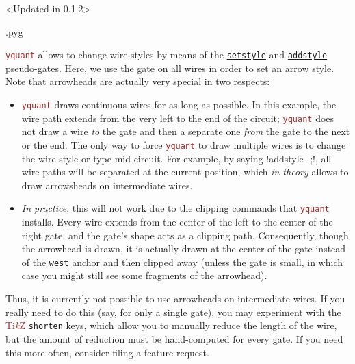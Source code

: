 \documentclass{scrartcl}
\makeatletter
\newenvironment{codeexample}{%
   \VerbatimEnvironment%
   \let\FVB@VerbatimOut\minted@FVB@VerbatimOut
   \let\FVE@VerbatimOut\minted@FVE@VerbatimOut
   \minted@configlang{tex}%
   \minted@fvset
   \begin{VerbatimOut}[codes={\catcode`\^^I=12},firstline,lastline]{\minted@jobname.pyg}%
}{
   \end{VerbatimOut}%
   \minted@langlinenoson%
   \savebox\codeexamplebox{ \minted@jobname.pyg}%
   \ifdim\wd\codeexamplebox>\dimexpr.5\linewidth-3mm\relax%
      \wd\codeexamplebox=.5\linewidth%
   \else%
      \wd\codeexamplebox=\dimexpr\wd\codeexamplebox+3mm\relax%
   \fi%
   \noindent\begin{minipage}{\wd\codeexamplebox}%
      \centering%
      \usebox\codeexamplebox%
   \end{minipage}%
   \begin{minipage}{\dimexpr\linewidth-\wd\codeexamplebox\relax}%
      \expandafter\minted@pygmentize\expandafter{\minted@lang}%
   \end{minipage}%
   \minted@langlinenosoff%
   \par%
}
\def\TikZ{\textcolor{brown}{Ti\textit kZ}}
\def\pkg#1{\textcolor{brown}{\texttt{#1}}}
\def\gate#1{\hyperref[gate:#1]{\texttt{#1}}}
\def\Yquant{\pkg{yquant}}
\makeatother
\begin{document}
               \begin{example}<Updated in 0.1.2>
                  \begin{codeexample}
                  \end{codeexample}
                  \Yquant{} allows to change wire styles by means of the \gate{setstyle} and \gate{addstyle} pseudo\hyp gates.
                  Here, we use the gate on all wires in order to set an arrow style.
                  Note that arrowheads are actually very special in two respects:
                  \begin{itemize}
                     \item \Yquant{} draws continuous wires for as long as possible.
                        In this example, the wire path extends from the very left to the end of the circuit; \Yquant{} does not draw a wire \emph{to} the gate and then a separate one \emph{from} the gate to the next or the end.
                        The only way to force \Yquant{} to draw multiple wires is to change the wire style or type mid\hyp circuit.
                        For example, by saying \yquant!addstyle {} -;!, all wire paths will be separated at the current position, which \emph{in theory} allows to draw arrowsheads on intermediate wires.
                     \item \emph{In practice}, this will not work due to the clipping commands that \Yquant{} installs.
                        Every wire extends from the center of the left to the center of the right gate, and the gate's shape acts as a clipping path.
                        Consequently, though the arrowhead is drawn, it is actually drawn at the center of the gate instead of the \texttt{west} anchor and then clipped away (unless the gate is small, in which case you might still see some fragments of the arrowhead).
                  \end{itemize}
                  Thus, it is currently not possible to use arrowheads on intermediate wires.
                  If you really need to do this (say, for only a single gate), you may experiment with the \TikZ{} \texttt{shorten} keys, which allow you to manually reduce the length of the wire, but the amount of reduction must be hand\hyp computed for every gate.
                  If you need this more often, consider filing a feature request.
               \end{example}
\end{document}
